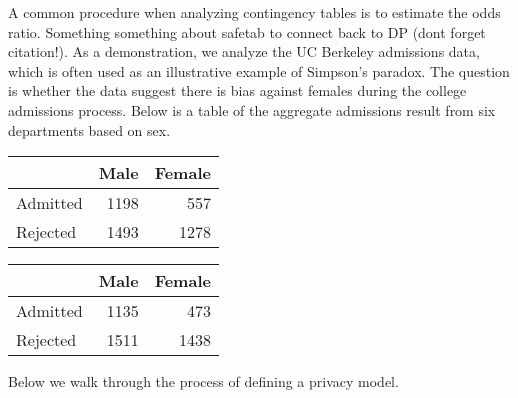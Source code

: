 A common procedure when analyzing contingency tables is to estimate the
odds ratio. Something something about safetab to connect back to DP (dont forget citation!).
As a demonstration, we analyze the UC Berkeley admissions data, which is often
used as an illustrative example of Simpson's paradox. The question is whether
the data suggest there is bias against females during the college admissions
process. Below is a table of the aggregate admissions result from six departments based on sex.

\begin{table}[!h]

\centering
\begin{tabular}[t]{lrr}
\toprule
  & Male & Female\\
\midrule
Admitted & 1198 & 557\\
Rejected & 1493 & 1278\\
\bottomrule
\end{tabular}
\centering
\begin{tabular}[t]{lrr}
\toprule
  & Male & Female\\
\midrule
Admitted & 1135 & 473\\
Rejected & 1511 & 1438\\
\bottomrule
\end{tabular}
\end{table}

Below we walk through the process of defining a privacy model.

